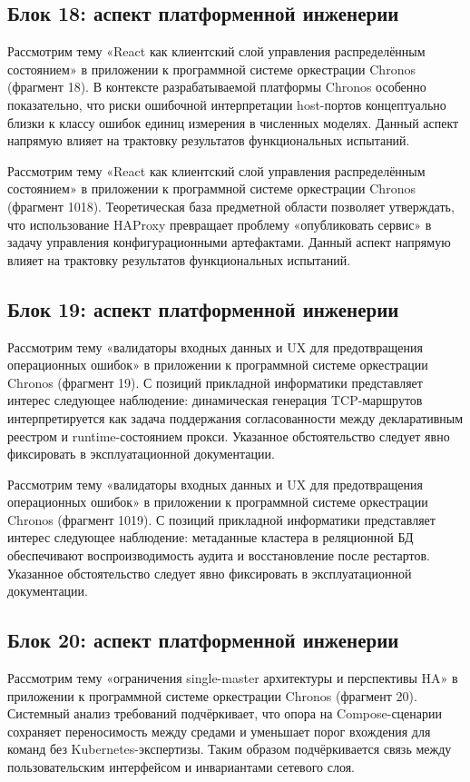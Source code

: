 \subsection{Блок 18: аспект платформенной инженерии}
 Рассмотрим тему «React как клиентский слой управления распределённым состоянием» в приложении к программной системе оркестрации Chronos (фрагмент 18). В контексте разрабатываемой платформы Chronos особенно показательно, что риски ошибочной интерпретации host-портов концептуально близки к классу ошибок единиц измерения в численных моделях. Данный аспект напрямую влияет на трактовку результатов функциональных испытаний.

 Рассмотрим тему «React как клиентский слой управления распределённым состоянием» в приложении к программной системе оркестрации Chronos (фрагмент 1018). Теоретическая база предметной области позволяет утверждать, что использование HAProxy превращает проблему «опубликовать сервис» в задачу управления конфигурационными артефактами. Данный аспект напрямую влияет на трактовку результатов функциональных испытаний.

\subsection{Блок 19: аспект платформенной инженерии}
 Рассмотрим тему «валидаторы входных данных и UX для предотвращения операционных ошибок» в приложении к программной системе оркестрации Chronos (фрагмент 19). С позиций прикладной информатики представляет интерес следующее наблюдение: динамическая генерация TCP-маршрутов интерпретируется как задача поддержания согласованности между декларативным реестром и runtime-состоянием прокси. Указанное обстоятельство следует явно фиксировать в эксплуатационной документации.

 Рассмотрим тему «валидаторы входных данных и UX для предотвращения операционных ошибок» в приложении к программной системе оркестрации Chronos (фрагмент 1019). С позиций прикладной информатики представляет интерес следующее наблюдение: метаданные кластера в реляционной БД обеспечивают воспроизводимость аудита и восстановление после рестартов. Указанное обстоятельство следует явно фиксировать в эксплуатационной документации.

\subsection{Блок 20: аспект платформенной инженерии}
 Рассмотрим тему «ограничения single-master архитектуры и перспективы HA» в приложении к программной системе оркестрации Chronos (фрагмент 20). Системный анализ требований подчёркивает, что опора на Compose-сценарии сохраняет переносимость между средами и уменьшает порог вхождения для команд без Kubernetes-экспертизы. Таким образом подчёркивается связь между пользовательским интерфейсом и инвариантами сетевого слоя.

